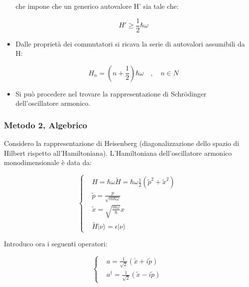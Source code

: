 \documentclass{report}
\begin{document}
\begin{itemize}
        che impone che un generico autovalore H' sia tale che:

        \begin{equation}
          H'\geq \frac{1}{2}\hbar \omega
        \end{equation}

  \item Dalle proprietà dei commutatori si ricava la serie di autovalori assumibili da H:

        \begin{equation}
          H_n=(n+\frac{1}{2})\hbar \omega \quad , \quad n \in N
        \end{equation}

  \item Si può procedere nel trovare la rappresentazione di Schrödinger dell'oscillatore armonico.
\end{itemize}

\subsubsection{Metodo 2, Algebrico}

Considero la rappresentazione di Heisenberg (diagonalizzazione dello spazio di Hilbert rispetto all'Hamiltoniana).
L'Hamiltoniana dell'oscillatore armonico monodimensionale è data da:

\begin{equation}
  \left\{
  \begin{aligned}
     & H=\hbar\omega\tilde{H}=\hbar\omega\frac{1}{2}(\tilde{p}^2+\tilde{x}^2) \\
     & \tilde{p}=\frac{p}{\sqrt{m\hbar \omega}}                               \\
     & \tilde{x}= \sqrt{\frac{m\omega}{\hbar}}x                               \\
     & \tilde{H}|\nu\rangle =\epsilon|\nu\rangle
  \end{aligned}
  \right.
\end{equation}

Introduco ora i seguenti operatori:

\begin{equation}
  \left\{
  \begin{aligned}
     & a= \frac{1}{\sqrt{2}}(\tilde{x}+i\tilde{p})           \\
     & a^{\dagger}= \frac{1}{\sqrt{2}}(\tilde{x}-i\tilde{p})
  \end{aligned}
  \right.
\end{equation}
\end{document}
